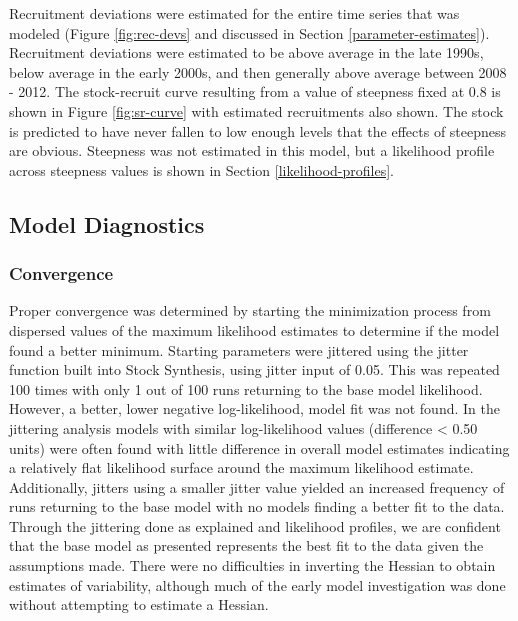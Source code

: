 \documentclass[11pt,
  english,
  a4paper,
]{article}
\begin{document}
\leavevmode\tagmcend\tagstructend\par


Recruitment deviations were estimated for the entire time series that was modeled (Figure \ref{fig:rec-devs} and discussed in Section \ref{parameter-estimates}). Recruitment deviations were estimated to be above average in the late 1990s, below average in the early 2000s, and then generally above average between 2008 - 2012. The stock-recruit curve resulting from a value of steepness fixed at 0.8 is shown in Figure \ref{fig:sr-curve} with estimated recruitments also shown. The stock is predicted to have never fallen to low enough levels that the effects of steepness are obvious. Steepness was not estimated in this model, but a likelihood profile across steepness values is shown in Section \ref{likelihood-profiles}.

\leavevmode\tagmcend\tagstructend\par


\hypertarget{model-diagnostics}{%
\subsection{Model Diagnostics}\label{model-diagnostics}}

\leavevmode\tagmcend\tagstructend


\hypertarget{convergence}{%
\subsubsection{Convergence}\label{convergence}}

\leavevmode\tagmcend\tagstructend


Proper convergence was determined by starting the minimization process from dispersed values of the maximum likelihood estimates to determine if the model found a better minimum. Starting parameters were jittered using the jitter function built into Stock Synthesis, using jitter input of 0.05. This was repeated 100 times with only 1 out of 100 runs returning to the base model likelihood. However, a better, lower negative log-likelihood, model fit was not found. In the jittering analysis models with similar log-likelihood values (difference \textless{} 0.50 units) were often found with little difference in overall model estimates indicating a relatively flat likelihood surface around the maximum likelihood estimate. Additionally, jitters using a smaller jitter value yielded an increased frequency of runs returning to the base model with no models finding a better fit to the data. Through the jittering done as explained and likelihood profiles, we are confident that the base model as presented represents the best fit to the data given the assumptions made. There were no difficulties in inverting the Hessian to obtain estimates of variability, although much of the early model investigation was done without attempting to estimate a Hessian.
\end{document}
